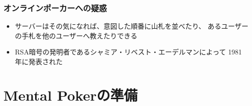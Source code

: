 \begin{frame}
  \frametitle{オンラインポーカーへの疑惑}
  

  \pause
  \begin{itemize}
    \item<+-> サーバーはその気になれば、意図した順番に山札を並べたり、
    あるユーザーの手札を他のユーザーへ教えたりできる
  \end{itemize}
  


  \begin{itemize}
    \item<+-> RSA暗号の発明者であるシャミア・リベスト・エーデルマンによって
    1981年に発表された\cite{Shamir1981}
  \end{itemize}

\end{frame}

\section{Mental Pokerの準備}

